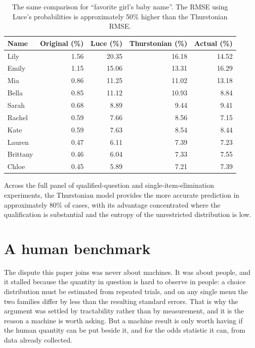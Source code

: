\documentclass[11pt]{article}
\begin{document}
\begin{table}[ht]
\centering
\begin{tabular}{lrrrr}
\toprule
Name & Original (\%) & Luce (\%) & Thurstonian (\%) & Actual (\%) \\
\midrule
Lily     & 1.56 & 20.35 & 16.18 & 14.52 \\
Emily    & 1.15 & 15.06 & 13.31 & 16.29 \\
Mia      & 0.86 & 11.25 & 11.02 & 13.18 \\
Bella    & 0.85 & 11.12 & 10.93 &  8.84 \\
Sarah    & 0.68 &  8.89 &  9.44 &  9.41 \\
Rachel   & 0.59 &  7.66 &  8.56 &  7.15 \\
Kate     & 0.59 &  7.63 &  8.54 &  8.44 \\
Lauren   & 0.47 &  6.11 &  7.39 &  7.23 \\
Brittany & 0.46 &  6.04 &  7.33 &  7.55 \\
Chloe    & 0.45 &  5.89 &  7.21 &  7.39 \\
\bottomrule
\end{tabular}
\caption{The same comparison for ``favorite girl's baby name''. The RMSE
using Luce's probabilities is approximately 50\% higher than the
Thurstonian RMSE.}
\label{tab:names}
\end{table}

Across the full panel of qualified-question and single-item-elimination
experiments, the Thurstonian model provides the more accurate prediction
in approximately 80\% of cases, with its advantage concentrated where the
qualification is substantial and the entropy of the unrestricted
distribution is low.

\section{A human benchmark}
\label{sec:human}

The dispute this paper joins was never about machines. It was about people, and
it stalled because the quantity in question is hard to observe in people: a
choice distribution must be estimated from repeated trials, and on any single
menu the two families differ by less than the resulting standard errors. That is
why the argument was settled by tractability rather than by measurement, and it
is the reason a machine is worth asking. But a machine result is only worth
having if the human quantity can be put beside it, and for the odds statistic it
can, from data already collected.
\end{document}
